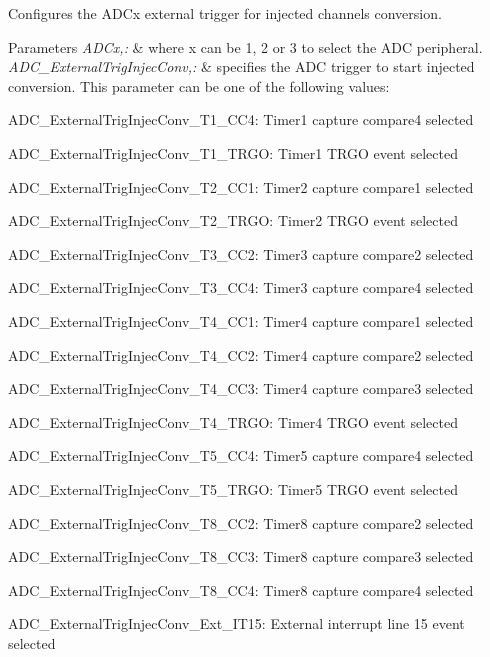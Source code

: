 Configures the A\-D\-Cx external trigger for injected channels conversion. 


\begin{DoxyParams}{Parameters}
{\em A\-D\-Cx,\-:} & where x can be 1, 2 or 3 to select the A\-D\-C peripheral. \\
\hline
{\em A\-D\-C\-\_\-\-External\-Trig\-Injec\-Conv,\-:} & specifies the A\-D\-C trigger to start injected conversion. This parameter can be one of the following values\-: \begin{DoxyItemize}
\item A\-D\-C\-\_\-\-External\-Trig\-Injec\-Conv\-\_\-\-T1\-\_\-\-C\-C4\-: Timer1 capture compare4 selected \item A\-D\-C\-\_\-\-External\-Trig\-Injec\-Conv\-\_\-\-T1\-\_\-\-T\-R\-G\-O\-: Timer1 T\-R\-G\-O event selected \item A\-D\-C\-\_\-\-External\-Trig\-Injec\-Conv\-\_\-\-T2\-\_\-\-C\-C1\-: Timer2 capture compare1 selected \item A\-D\-C\-\_\-\-External\-Trig\-Injec\-Conv\-\_\-\-T2\-\_\-\-T\-R\-G\-O\-: Timer2 T\-R\-G\-O event selected \item A\-D\-C\-\_\-\-External\-Trig\-Injec\-Conv\-\_\-\-T3\-\_\-\-C\-C2\-: Timer3 capture compare2 selected \item A\-D\-C\-\_\-\-External\-Trig\-Injec\-Conv\-\_\-\-T3\-\_\-\-C\-C4\-: Timer3 capture compare4 selected \item A\-D\-C\-\_\-\-External\-Trig\-Injec\-Conv\-\_\-\-T4\-\_\-\-C\-C1\-: Timer4 capture compare1 selected \item A\-D\-C\-\_\-\-External\-Trig\-Injec\-Conv\-\_\-\-T4\-\_\-\-C\-C2\-: Timer4 capture compare2 selected \item A\-D\-C\-\_\-\-External\-Trig\-Injec\-Conv\-\_\-\-T4\-\_\-\-C\-C3\-: Timer4 capture compare3 selected \item A\-D\-C\-\_\-\-External\-Trig\-Injec\-Conv\-\_\-\-T4\-\_\-\-T\-R\-G\-O\-: Timer4 T\-R\-G\-O event selected \item A\-D\-C\-\_\-\-External\-Trig\-Injec\-Conv\-\_\-\-T5\-\_\-\-C\-C4\-: Timer5 capture compare4 selected \item A\-D\-C\-\_\-\-External\-Trig\-Injec\-Conv\-\_\-\-T5\-\_\-\-T\-R\-G\-O\-: Timer5 T\-R\-G\-O event selected \item A\-D\-C\-\_\-\-External\-Trig\-Injec\-Conv\-\_\-\-T8\-\_\-\-C\-C2\-: Timer8 capture compare2 selected \item A\-D\-C\-\_\-\-External\-Trig\-Injec\-Conv\-\_\-\-T8\-\_\-\-C\-C3\-: Timer8 capture compare3 selected \item A\-D\-C\-\_\-\-External\-Trig\-Injec\-Conv\-\_\-\-T8\-\_\-\-C\-C4\-: Timer8 capture compare4 selected \item A\-D\-C\-\_\-\-External\-Trig\-Injec\-Conv\-\_\-\-Ext\-\_\-\-I\-T15\-: External interrupt line 15 event selected \end{DoxyItemize}
\\
\hline
\end{DoxyParams}

